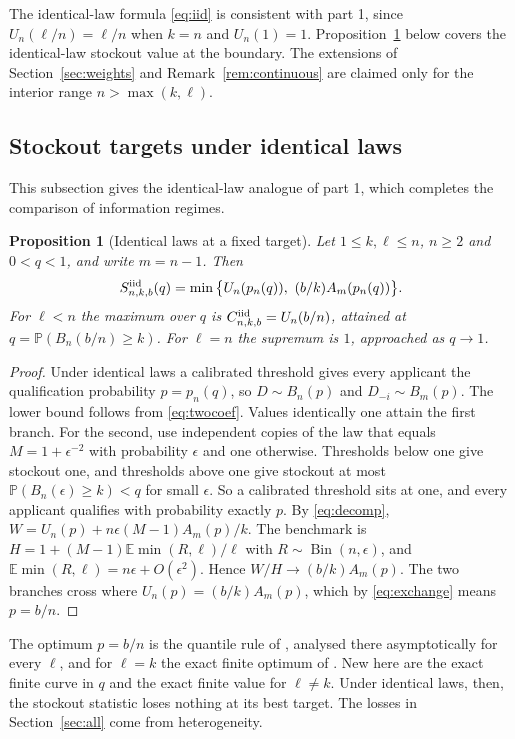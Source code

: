 \documentclass[11pt,a4paper]{article}
\newtheorem{prop}[thm]{Proposition}
\theoremstyle{remark}
\newcommand{\E}{\mathbb E}
\newcommand{\Prob}{\mathbb P}
\newcommand{\Bin}{\operatorname{Bin}}
\begin{document}
The identical-law formula \eqref{eq:iid} is consistent with part 1, since $U_n(\ell/n)=\ell/n$ when $k=n$ and $U_n(1)=1$. Proposition~\ref{prop:iidq} below covers the identical-law stockout value at the boundary. The extensions of Section~\ref{sec:weights} and Remark~\ref{rem:continuous} are claimed only for the interior range $n>\max(k,\ell)$.

\subsection{Stockout targets under identical laws}
This subsection gives the identical-law analogue of part 1, which completes the comparison of information regimes.

\begin{prop}[Identical laws at a fixed target]\label{prop:iidq}
Let $1\le k,\ell\le n$, $n\ge2$ and $0<q<1$, and write $m=n-1$. Then
\[
 S^{\rm iid}_{n,k,b}(q)=\min\big\{U_n(p_n(q)),\ (b/k)A_m(p_n(q))\big\}.
\]
For $\ell<n$ the maximum over $q$ is $C^{\rm iid}_{n,k,b}=U_n(b/n)$, attained at $q=\Prob(B_n(b/n)\ge k)$. For $\ell=n$ the supremum is $1$, approached as $q\to1$.
\end{prop}
\begin{proof}
Under identical laws a calibrated threshold gives every applicant the qualification probability $p=p_n(q)$, so $D\sim B_n(p)$ and $D_{-i}\sim B_m(p)$. The lower bound follows from \eqref{eq:twocoef}. Values identically one attain the first branch. For the second, use independent copies of the law that equals $M=1+\epsilon^{-2}$ with probability $\epsilon$ and one otherwise. Thresholds below one give stockout one, and thresholds above one give stockout at most $\Prob(B_n(\epsilon)\ge k)<q$ for small $\epsilon$. So a calibrated threshold sits at one, and every applicant qualifies with probability exactly $p$. By \eqref{eq:decomp}, $W=U_n(p)+n\epsilon(M-1)A_m(p)/k$. The benchmark is $H=1+(M-1)\E\min(R,\ell)/\ell$ with $R\sim\Bin(n,\epsilon)$, and $\E\min(R,\ell)=n\epsilon+O(\epsilon^2)$. Hence $W/H\to(b/k)A_m(p)$. The two branches cross where $U_n(p)=(b/k)A_m(p)$, which by \eqref{eq:exchange} means $p=b/n$.
\end{proof}
The optimum $p=b/n$ is the quantile rule of \cite[Proposition~6.1]{mg}, analysed there asymptotically for every $\ell$, and for $\ell=k$ the exact finite optimum of \cite[Theorem~8]{jmz}. New here are the exact finite curve in $q$ and the exact finite value for $\ell\neq k$. Under identical laws, then, the stockout statistic loses nothing at its best target. The losses in Section~\ref{sec:all} come from heterogeneity.
\end{document}
